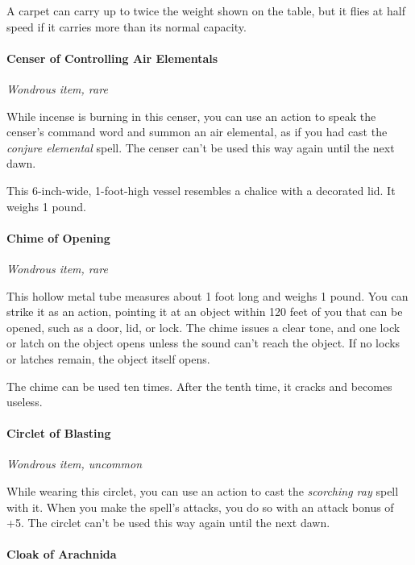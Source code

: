 \documentclass[
]{article}
\begin{document}
A carpet can carry up to twice the weight shown on the table, but it
flies at half speed if it carries more than its normal capacity.

\hypertarget{censer-of-controlling-air-elementals}{%
\paragraph{Censer of Controlling Air
Elementals}\label{censer-of-controlling-air-elementals}}

\emph{Wondrous item, rare}

While incense is burning in this censer, you can use an action to speak
the censer's command word and summon an air elemental, as if you had
cast the \emph{conjure elemental} spell. The censer can't be used this
way again until the next dawn.

This 6-inch-wide, 1-foot-high vessel resembles a chalice with a
decorated lid. It weighs 1 pound.

\hypertarget{chime-of-opening}{%
\paragraph{Chime of Opening}\label{chime-of-opening}}

\emph{Wondrous item, rare}

This hollow metal tube measures about 1 foot long and weighs 1 pound.
You can strike it as an action, pointing it at an object within 120 feet
of you that can be opened, such as a door, lid, or lock. The chime
issues a clear tone, and one lock or latch on the object opens unless
the sound can't reach the object. If no locks or latches remain, the
object itself opens.

The chime can be used ten times. After the tenth time, it cracks and
becomes useless.

\hypertarget{circlet-of-blasting}{%
\paragraph{Circlet of Blasting}\label{circlet-of-blasting}}

\emph{Wondrous item, uncommon}

While wearing this circlet, you can use an action to cast the
\emph{scorching ray} spell with it. When you make the spell's attacks,
you do so with an attack bonus of +5. The circlet can't be used this way
again until the next dawn.

\hypertarget{cloak-of-arachnida}{%
\paragraph{Cloak of Arachnida}\label{cloak-of-arachnida}}
\end{document}
